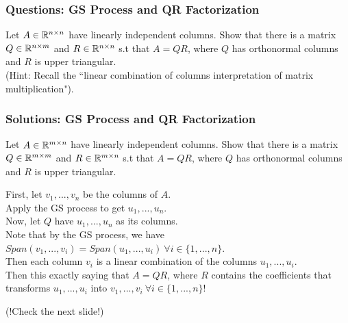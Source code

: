 \documentclass[table]{beamer}
\renewenvironment{enumerate}%
{\begin{list}{\arabic{enumi}.}%
      {\setlength{\leftmargin}{2.5em}%
       \setlength{\itemsep}{-\parsep}%
       \setlength{\topsep}{-\parskip}%
       \usecounter{enumi}}%
 }{\end{list}}
\begin{document}
\begin{frame}
\frametitle{Questions: GS Process and QR Factorization}
\begin{enumerate}
\item Let $A\in \mathbb{R}^{n\times n}$ have linearly independent columns. Show that there is a matrix $Q\in \mathbb{R}^{n \times m}$ and $R \in \mathbb{R}^{n\times n} $ s.t that $A=QR$, where $Q$ has orthonormal columns and $R$ is upper triangular. \\
\medskip
(Hint: Recall the ``linear combination of columns interpretation of matrix multiplication").
\end{enumerate}
\end{frame}

\begin{frame}

\begin{enumerate}
\frametitle{Solutions: GS Process and QR Factorization}

\item Let $A\in \mathbb{R}^{m\times n}$ have linearly independent columns. Show that there is a matrix $Q\in \mathbb{R}^{m\times m}$ and $R \in \mathbb{R}^{m\times n} $ s.t that $A=QR$, where $Q$ has orthonormal columns and $R$ is upper triangular. \\
\begin{solution}
First, let $v_1,...,v_n$ be the columns of $A$.\\
 Apply the GS process to get $u_1,...,u_n$. \\
 Now, let $Q$ have $u_1,...,u_n$ as its columns. \\
 Note that by the GS process, we have $Span(v_1,..., v_i) = Span(u_1,...,u_i)\ \forall i\in \{1,...,n\}$.\\
  Then each column $v_i$ is a linear combination of the columns $u_1,...,u_i$. \\
  Then this exactly saying that $A=QR$, where $R$ contains the coefficients that transforms $u_1,...,u_i$ into $v_1,...,v_i\ \forall i \in \{1,...,n\}$!
\end{solution}
\end{enumerate}
(!Check the next slide!)
\end{frame}
\end{document}
